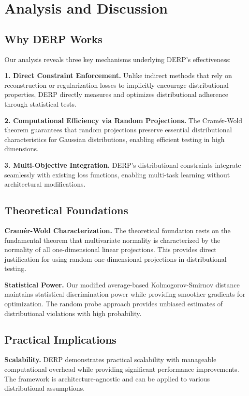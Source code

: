\documentclass{article}
\begin{document}
\section{Analysis and Discussion}

\subsection{Why DERP Works}

Our analysis reveals three key mechanisms underlying DERP's effectiveness:

\textbf{1. Direct Constraint Enforcement.} Unlike indirect methods that rely on reconstruction or regularization losses to implicitly encourage distributional properties, DERP directly measures and optimizes distributional adherence through statistical tests.

\textbf{2. Computational Efficiency via Random Projections.} The Cramér-Wold theorem guarantees that random projections preserve essential distributional characteristics for Gaussian distributions, enabling efficient testing in high dimensions.

\textbf{3. Multi-Objective Integration.} DERP's distributional constraints integrate seamlessly with existing loss functions, enabling multi-task learning without architectural modifications.

\subsection{Theoretical Foundations}

\textbf{Cramér-Wold Characterization.} The theoretical foundation rests on the fundamental theorem that multivariate normality is characterized by the normality of all one-dimensional linear projections. This provides direct justification for using random one-dimensional projections in distributional testing.

\textbf{Statistical Power.} Our modified average-based Kolmogorov-Smirnov distance maintains statistical discrimination power while providing smoother gradients for optimization. The random probe approach provides unbiased estimates of distributional violations with high probability.

\subsection{Practical Implications}

\textbf{Scalability.} DERP demonstrates practical scalability with manageable computational overhead while providing significant performance improvements. The framework is architecture-agnostic and can be applied to various distributional assumptions.
\end{document}
